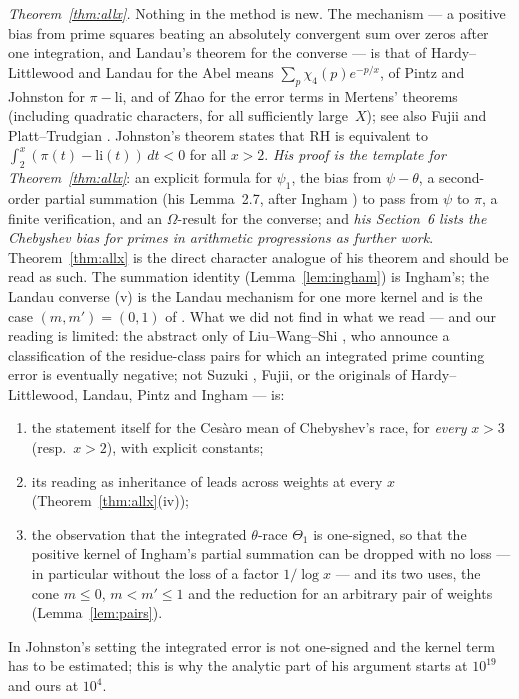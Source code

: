 \documentclass[11pt]{amsart}
\theoremstyle{definition}
\numberwithin{equation}{section}
\begin{document}
\emph{Theorem~\ref{thm:allx}.} Nothing in the method is new. The
mechanism --- a positive bias from prime squares beating an
absolutely convergent sum over zeros after one integration, and
Landau's theorem for the converse --- is that of Hardy--Littlewood
and Landau \cite{HL18,Lan18} for the Abel means
$\sum_p\chi_4(p)e^{-p/x}$, of Pintz \cite{Pin91} and Johnston
\cite{Joh23} for $\pi-\mathrm{li}$, and of Zhao \cite{Zhao25} for the
error terms in Mertens' theorems (including quadratic characters, for
all sufficiently large~$X$); see also Fujii \cite{Fuj88} and
Platt--Trudgian \cite{PT19}. Johnston's theorem \cite[Theorem~1.1]{Joh23}
states that RH is equivalent to $\int_2^x(\pi(t)-\mathrm{li}(t))\,dt<0$
for all $x>2$. \emph{His proof is the template for
Theorem~\ref{thm:allx}}: an explicit formula for $\psi_1$, the bias
from $\psi-\theta$, a second-order partial summation (his Lemma~2.7,
after Ingham \cite[pp.~103--104]{Ing32}) to pass from $\psi$ to $\pi$,
a finite verification, and an $\Omega$-result for the converse; and
\emph{his Section~6 lists the Chebyshev bias for primes in arithmetic
progressions as further work}. Theorem~\ref{thm:allx} is the direct
character analogue of his theorem and should be read as such. The
summation identity (Lemma~\ref{lem:ingham}) is Ingham's; the Landau
converse (v) is the Landau mechanism for one more kernel and is the
case $(m,m')=(0,1)$ of \cite[the corollary ``equivalence with GRH for $q\in\{3,4\}$'', part~(a)]{MC}. What we did not
find in what we read --- and our reading is limited: the abstract
only of Liu--Wang--Shi \cite{LWS26}, who announce a classification of
the residue-class pairs for which an integrated prime counting error
is eventually negative; not Suzuki \cite{Suz25}, Fujii, or the
originals of Hardy--Littlewood, Landau, Pintz and Ingham --- is:
\begin{enumerate}
\item[(a)] the statement itself for the Ces\`aro mean of Chebyshev's
race, for \emph{every} $x>3$ (resp.\ $x>2$), with explicit constants;
\item[(b)] its reading as inheritance of leads across weights at
every $x$ (Theorem~\ref{thm:allx}(iv));
\item[(c)] the observation that the integrated $\theta$-race
$\Theta_1$ is one-signed, so that the positive kernel of Ingham's
partial summation can be dropped with no loss --- in particular
without the loss of a factor $1/\log x$ --- and its two uses, the
cone $m\le0$, $m<m'\le1$ and the reduction for an arbitrary pair of
weights (Lemma~\ref{lem:pairs}).
\end{enumerate}
In Johnston's setting the integrated error is not one-signed and the
kernel term has to be estimated; this is why the analytic part of
his argument starts at $10^{19}$ and ours at $10^4$.
\end{document}

